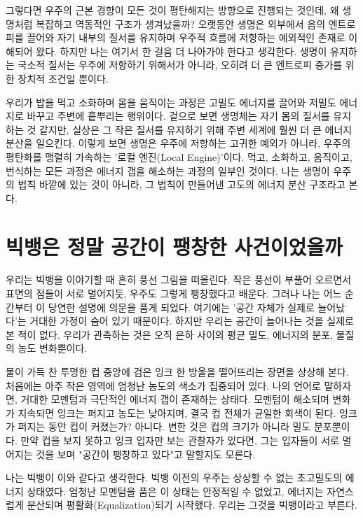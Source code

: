 \documentclass[12pt,a4paper]{article}
\begin{document}
그렇다면 우주의 근본 경향이 모든 것이 평탄해지는 방향으로 진행되는 것인데, 왜 생명처럼 복잡하고 역동적인 구조가 생겨났을까? 오랫동안 생명은 외부에서 음의 엔트로피를 끌어와 자기 내부의 질서를 유지하며 우주적 흐름에 저항하는 예외적인 존재로 이해되어 왔다. 하지만 나는 여기서 한 걸음 더 나아가야 한다고 생각한다. 생명이 유지하는 국소적 질서는 우주에 저항하기 위해서가 아니라, 오히려 더 큰 엔트로피 증가를 위한 장치적 조건일 뿐이다.

우리가 밥을 먹고 소화하며 몸을 움직이는 과정은 고밀도 에너지를 끌어와 저밀도 에너지로 바꾸고 주변에 흩뿌리는 행위이다. 겉으로 보면 생명체는 자기 몸의 질서를 유지하는 것 같지만, 실상은 그 작은 질서를 유지하기 위해 주변 세계에 훨씬 더 큰 에너지 분산을 일으킨다. 이렇게 보면 생명은 우주에 저항하는 고귀한 예외가 아니라, 우주의 평탄화를 맹렬히 가속하는 '로컬 엔진(Local Engine)'이다. 먹고, 소화하고, 움직이고, 번식하는 모든 과정은 에너지 갭을 해소하는 과정의 일부인 것이다. 나는 생명이 우주의 법칙 바깥에 있는 것이 아니라, 그 법칙이 만들어낸 고도의 에너지 분산 구조라고 본다.

\section{빅뱅은 정말 공간이 팽창한 사건이었을까}
우리는 빅뱅을 이야기할 때 흔히 풍선 그림을 떠올린다. 작은 풍선이 부풀어 오르면서 표면의 점들이 서로 멀어지듯, 우주도 그렇게 팽창했다고 배운다. 그러나 나는 어느 순간부터 이 당연한 설명에 의문을 품게 되었다. 여기에는 '공간 자체가 실제로 늘어났다'는 거대한 가정이 숨어 있기 때문이다. 하지만 우리는 공간이 늘어나는 것을 실제로 본 적이 없다. 우리가 관측하는 것은 오직 은하 사이의 평균 밀도, 에너지의 분포, 물질의 농도 변화뿐이다.

물이 가득 찬 투명한 컵 중앙에 검은 잉크 한 방울을 떨어뜨리는 장면을 상상해 본다. 처음에는 아주 작은 영역에 엄청난 농도의 색소가 집중되어 있다. 나의 언어로 말하자면, 거대한 모멘텀과 극단적인 에너지 갭이 존재하는 상태다. 모멘텀이 해소되며 변화가 지속되면 잉크는 퍼지고 농도는 낮아지며, 결국 컵 전체가 균일한 회색이 된다. 잉크가 퍼지는 동안 컵이 커졌는가? 아니다. 변한 것은 컵의 크기가 아니라 밀도 분포뿐이다. 만약 컵을 보지 못하고 잉크 입자만 보는 관찰자가 있다면, 그는 입자들이 서로 멀어지는 것을 보며 "공간이 팽창하고 있다"고 말할지도 모른다.

나는 빅뱅이 이와 같다고 생각한다. 빅뱅 이전의 우주는 상상할 수 없는 초고밀도의 에너지 상태였다. 엄청난 모멘텀을 품은 이 상태는 안정적일 수 없었고, 에너지는 자연스럽게 분산되며 평활화(Equalization)되기 시작했다. 우리는 그것을 빅뱅이라고 부른다.
\end{document}
